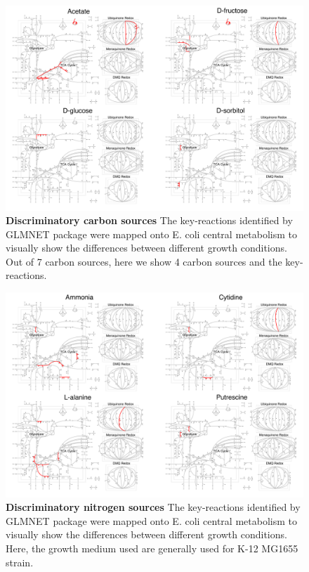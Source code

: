 \documentclass[12pt]{article}
\begin{document}
\clearpage
\begin{figure}[p]
\centerline{\includegraphics[width=7in]{Figures/carbon/carbon_grid.pdf}}
\caption{\label{fig:carbon_network}\textbf{Discriminatory carbon sources} The key-reactions identified by GLMNET package were mapped onto E. coli central metabolism to visually show the differences between different growth conditions. Out of 7 carbon sources, here we show 4 carbon sources and the key-reactions.}
\end{figure}

\clearpage
\begin{figure}[p]
\centerline{\includegraphics[width=7in]{Figures/nitrogen/nitrogen_grid.pdf}}
\caption{\label{fig:nitrogen_network}\textbf{Discriminatory nitrogen sources} The key-reactions identified by GLMNET package were mapped onto E. coli central metabolism to visually show the differences between different growth conditions. Here, the growth medium used are generally used for K-12 MG1655 strain.}
\end{figure}
\end{document}
